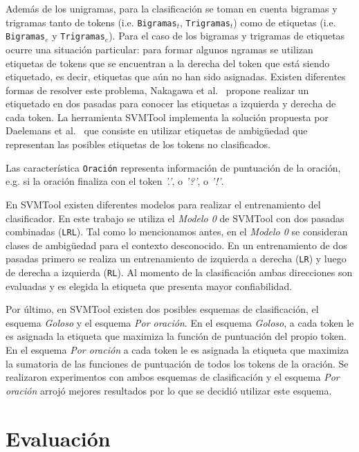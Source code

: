 \documentclass[runningheads,a4paper]{llncs}
\begin{document}
Adem\'as de los unigramas, para la clasificaci\'on se toman en cuenta bigramas y trigramas tanto de tokens (i.e. \texttt{\small Bigramas$_{t}$}, \texttt{\small Trigramas$_{t}$}) como de etiquetas (i.e. \texttt{\small Bigramas$_{e}$} y \texttt{\small Trigramas$_{e}$}). Para el caso de los bigramas y trigramas de etiquetas ocurre una situaci\'on particular: para formar algunos ngramas se utilizan etiquetas de tokens que se encuentran a la derecha del token que está siendo etiquetado, es decir, etiquetas que aún no han sido asignadas. Existen diferentes formas de resolver este problema, Nakagawa et al.~\cite{NAKAGAWA01} propone realizar un etiquetado en dos pasadas para conocer las etiquetas a izquierda y derecha de cada token. La herramienta SVMTool implementa la solución propuesta por \hbox{Daelemans} et al.~\cite{DAELEMANS96} que consiste en utilizar etiquetas de ambig\"uedad que representan las posibles etiquetas de los tokens no clasificados.

Las caracter\'istica \texttt{\small Oraci\'on} representa información de puntuación de la oración, e.g. si la oración finaliza con el token \emph{'.'}, o \emph{'?'}, o \emph{'!'}.

En SVMTool existen diferentes modelos para realizar el entrenamiento del clasificador. En este trabajo se utiliza el \emph{Modelo 0} de SVMTool con dos pasadas combinadas (\texttt{\small LRL}). Tal como lo mencionamos antes, en el \emph{Modelo 0} se consideran clases de ambig\"uedad para el contexto desconocido. En un entrenamiento de dos pasadas primero se realiza un entrenamiento de izquierda a derecha (\texttt{\small LR}) y luego de derecha a izquierda (\texttt{\small RL}). Al momento de la clasificación ambas direcciones son evaluadas y es elegida la etiqueta que presenta mayor confiabilidad.

Por último, en SVMTool existen dos posibles esquemas de clasificación, el esquema \emph{Goloso} y el esquema \emph{Por oración}. En el esquema \emph{Goloso}, a cada token le es asignada la etiqueta que maximiza la función de puntuación del propio token. En el esquema \emph{Por oración} a cada token le es asignada la etiqueta que maximiza la sumatoria de las funciones de puntuación de todos los tokens de la oración. Se realizaron experimentos con ambos esquemas de clasificación y el esquema \emph{Por oración} arrojó mejores resultados por lo que se decidió utilizar este esquema.

\section{Evaluación}
\label{sec:Resultados}
\end{document}
